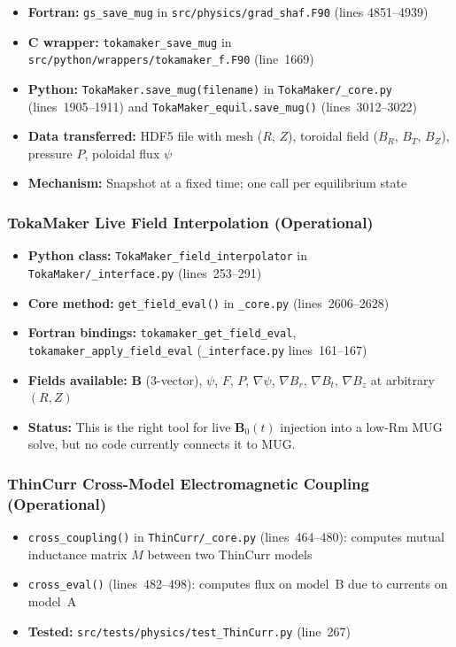 \documentclass[11pt,letterpaper]{article}
\begin{document}
\begin{itemize}
  \item \textbf{Fortran:} \texttt{gs\_save\_mug} in \texttt{src/physics/grad\_shaf.F90}
    (lines 4851--4939)
  \item \textbf{C wrapper:} \texttt{tokamaker\_save\_mug} in
    \texttt{src/python/wrappers/tokamaker\_f.F90} (line~1669)
  \item \textbf{Python:} \texttt{TokaMaker.save\_mug(filename)} in
    \texttt{TokaMaker/\_core.py} (lines~1905--1911) and
    \texttt{TokaMaker\_equil.save\_mug()} (lines~3012--3022)
  \item \textbf{Data transferred:} HDF5 file with mesh ($R$, $Z$), toroidal
    field ($B_R$, $B_T$, $B_Z$), pressure $P$, poloidal flux $\psi$
  \item \textbf{Mechanism:} Snapshot at a fixed time; one call per equilibrium state
\end{itemize}

\subsubsection{TokaMaker Live Field Interpolation (Operational)}

\begin{itemize}
  \item \textbf{Python class:} \texttt{TokaMaker\_field\_interpolator} in
    \texttt{TokaMaker/\_interface.py} (lines~253--291)
  \item \textbf{Core method:} \texttt{get\_field\_eval()} in \texttt{\_core.py}
    (lines~2606--2628)
  \item \textbf{Fortran bindings:} \texttt{tokamaker\_get\_field\_eval},
    \texttt{tokamaker\_apply\_field\_eval} (\texttt{\_interface.py}
    lines~161--167)
  \item \textbf{Fields available:} $\mathbf{B}$ (3-vector), $\psi$, $F$, $P$,
    $\nabla\psi$, $\nabla B_r$, $\nabla B_t$, $\nabla B_z$ at arbitrary $(R,Z)$
  \item \textbf{Status:} This is the right tool for live $\mathbf{B}_0(t)$
    injection into a low-Rm MUG solve, but no code currently connects it to MUG.
\end{itemize}

\subsubsection{ThinCurr Cross-Model Electromagnetic Coupling (Operational)}

\begin{itemize}
  \item \texttt{cross\_coupling()} in \texttt{ThinCurr/\_core.py}
    (lines~464--480): computes mutual inductance matrix $M$ between two
    ThinCurr models
  \item \texttt{cross\_eval()} (lines~482--498): computes flux on model~B due
    to currents on model~A
  \item \textbf{Tested:} \texttt{src/tests/physics/test\_ThinCurr.py} (line~267)
\end{itemize}
\end{document}
